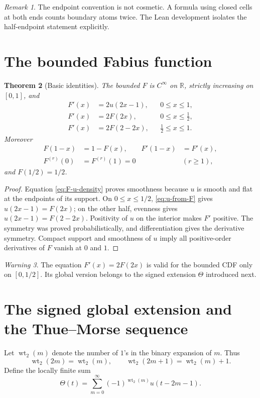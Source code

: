 \documentclass[11pt]{article}
\newtheorem{theorem}{Theorem}[section]
\theoremstyle{definition}
\theoremstyle{remark}
\newtheorem{remark}[theorem]{Remark}
\newtheorem{warning}[theorem]{Warning}
\newcommand{\R}{\mathbb R}\newcommand{\C}{\mathbb C}\newcommand{\Z}{\mathbb Z}
\newcommand{\wt}{\operatorname{wt}_2}\newcommand{\upfun}{\operatorname{up}}
\begin{document}
\begin{remark}
The endpoint convention is not cosmetic.  A formula using closed cells at both ends counts boundary atoms twice.  The Lean development isolates the half-endpoint statement explicitly.
\end{remark}

\section{The bounded Fabius function}\label{sec:bounded}
\begin{theorem}[Basic identities]\label{thm:F-basic}
The bounded $F$ is $C^\infty$ on $\R$, strictly increasing on $[0,1]$, and
\begin{align}
 F'(x)&=2u(2x-1),&&0\le x\le1,\label{eq:Fprime-u}\\
 F'(x)&=2F(2x),&&0\le x\le\tfrac12,\label{eq:Fprime-left}\\
 F'(x)&=2F(2-2x),&&\tfrac12\le x\le1.\label{eq:Fprime-right}
\end{align}
Moreover
\begin{align}
 F(1-x)&=1-F(x),&F'(1-x)&=F'(x),\label{eq:F-symmetries}\\
 F^{(r)}(0)&=F^{(r)}(1)=0&& (r\ge1),\label{eq:F-flat}
\end{align}
and $F(1/2)=1/2$.
\end{theorem}
\begin{proof}
Equation \eqref{eq:F-u-density} proves smoothness because $u$ is smooth and flat at the endpoints of its support.  On $0\le x\le1/2$, \eqref{eq:u-from-F} gives $u(2x-1)=F(2x)$; on the other half, evenness gives $u(2x-1)=F(2-2x)$.  Positivity of $u$ on the interior makes $F'$ positive.  The symmetry was proved probabilistically, and differentiation gives the derivative symmetry.  Compact support and smoothness of $u$ imply all positive-order derivatives of $F$ vanish at $0$ and $1$.
\end{proof}

\begin{warning}
The equation $F'(x)=2F(2x)$ is valid for the bounded CDF only on $[0,1/2]$.  Its global version belongs to the signed extension $\Theta$ introduced next.
\end{warning}

\section{The signed global extension and the Thue--Morse sequence}\label{sec:theta}
Let $\wt(m)$ denote the number of $1$'s in the binary expansion of $m$.  Thus
\begin{equation}\label{eq:wt-rec}
 \wt(2m)=\wt(m),\qquad \wt(2m+1)=\wt(m)+1.
\end{equation}
Define the locally finite sum
\begin{equation}\label{eq:theta-def}
 \Theta(t)=\sum_{m=0}^{\infty}(-1)^{\wt(m)}u(t-2m-1).
\end{equation}
\end{document}
